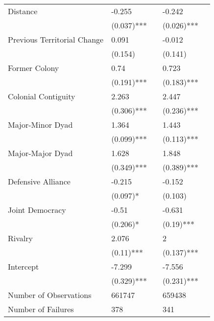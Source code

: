 \begin{table}[htpb]
\begin{tabular}{lllll}
		Distance                    & -0.255     &                            & -0.242     &                            \\
		& (0.037)*** &                            & (0.026)*** &                            \\
		Previous Territorial Change & 0.091      &                            & -0.012     &                            \\
		& (0.154)    &                            & (0.141)    &                            \\
		Former Colony               & 0.74       &                            & 0.723      &                            \\
		& (0.191)*** &                            & (0.183)*** &                            \\
		Colonial Contiguity         & 2.263      &                            & 2.447      &                            \\
		& (0.306)*** &                            & (0.236)*** &                            \\
		Major-Minor Dyad            & 1.364      &                            & 1.443      &                            \\
		& (0.099)*** &                            & (0.113)*** &                            \\
		Major-Major Dyad            & 1.628      &                            & 1.848      &                            \\
		& (0.349)*** &                            & (0.389)*** &                            \\
		Defensive Alliance          & -0.215     &                            & -0.152     &                            \\
		& (0.097)*   &                            & (0.103)    &                            \\
		Joint Democracy             & -0.51      &                            & -0.631     &                            \\
		& (0.206)*   &                            & (0.19)***  &                            \\
		Rivalry                     & 2.076      &                            & 2          &                            \\
		& (0.11)***  &                            & (0.137)*** &                            \\
		Intercept                   & -7.299     &                            & -7.556     &                            \\
		& (0.329)*** &                            & (0.231)*** &                            \\
		Number of Observations      & 661747     &                           & 659438     &                          \\
		Number of Failures          & 378        &                           & 341        &                          \\ \hline
	\end{tabular}
\end{table}

